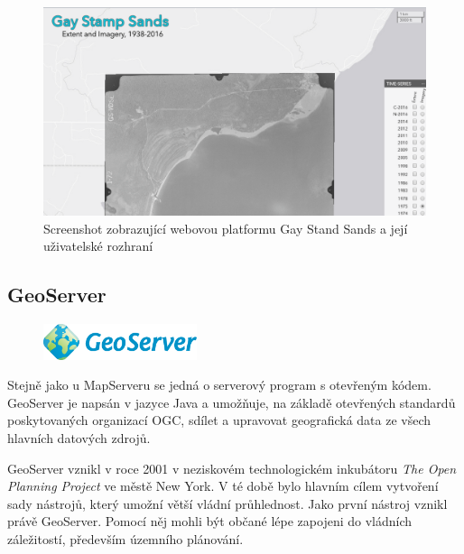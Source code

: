 \begin{figure}[h!]  \centering
\includegraphics[width=1\textwidth]{../img/gay-sands.png}
	\caption{Screenshot zobrazující webovou platformu Gay Stand
Sands a její uživatelské rozhraní}
	\label{fig:gay-sands}
\end{figure}

\newpage
\subsection{GeoServer}

\begin{figure}[h!]  \centering
\includegraphics[width=0.4\textwidth]{../img/geoserver-logo.png}
	\label{fig:geoserver-logo}
\end{figure} \bigskip

Stejně jako u MapServeru se jedná o serverový program s otevřeným
kódem. GeoServer je napsán v jazyce Java a umožňuje, na základě
otevřených standardů poskytovaných organizací OGC, sdílet a upravovat
geografická data ze všech hlavních datových zdrojů.

GeoServer vznikl v roce 2001 v neziskovém technologickém inkubátoru
\textit{The Open Planning Project} ve městě New York. V té době bylo
hlavním cílem vytvoření sady nástrojů, který umožní větší vládní
průhlednost. Jako první nástroj vznikl právě GeoServer. Pomocí něj
mohli být občané lépe zapojeni do vládních záležitostí, především
územního plánování.

